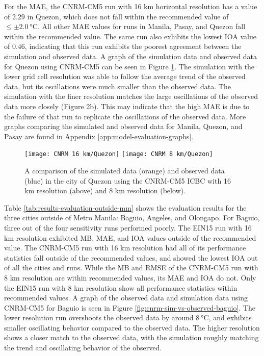 		For the MAE, the CNRM-CM5 run with 16 km horizontal resolution has a value of $2.29$ in Quezon, which does not fall within the recommended value of $\leq \pm \qty{2.0}{\degreeCelsius}$.
		All other MAE values for runs in Manila, Pasay, and Quezon fall within the recommended value.
		The same run also exhibits the lowest IOA value of $0.46$, indicating that this run exhibits the poorest agreement between the simulation and observed data.
		A graph of the simulation data and observed data for Quezon using CNRM-CM5 can be seen in Figure \ref{fig:cnrm-sim-vs-observed-quezon}. 
		The simulation with the lower grid cell resolution was able to follow the average trend of the observed data, but its oscillations were much smaller than the observed data.
		The simulation with the finer resolution matches the large oscillations of the observed data more closely (Figure 2b).
		This may indicate that the high MAE is due to the failure of that run to replicate the oscillations of the observed data.
		More graphs comparing the simulated and observed data for Manila, Quezon, and Pasay are found in Appendix \ref{app:model-evaluation-graphs}.

		
		\begin{figure}	
			\centering
			\texttt{[image: CNRM 16 km/Quezon]}
			\texttt{[image: CNRM 8 km/Quezon]}
			\caption{
				A comparison of the simulated data (orange) and observed data (blue) in the city of Quezon using the CNRM-CM5 ICBC with 16 km resolution (above) and 8 km resolution (below).
			}
			\label{fig:cnrm-sim-vs-observed-quezon}
		\end{figure}
		
		Table \ref{tab:results-evaluation-outside-mm} shows the evaluation results for the three cities outside of Metro Manila: Baguio, Angeles, and Olongapo.
		For Baguio, three out of the four sensitivity runs performed poorly.
		The EIN15 run with 16 km resolution exhibited MB, MAE, and IOA values outside of the recommended value.
		The CNRM-CM5 run with 16 km resolution had all of its performance statistics fall outside of the recommended values, and showed the lowest IOA out of all the cities and runs.
		While the MB and RMSE of the CNRM-CM5 run with 8 km resolution are within recommended values, its MAE and IOA do not.
		Only the EIN15 run with 8 km resolution show all performance statistics within recommended values.
		A graph of the observed data and simulation data using CNRM-CM5 for Baguio is seen in Figure \ref{fig:cnrm-sim-vs-observed-baguio}.
		The lower resolution run overshoots the observed data by around $\qty{8}{\degreeCelsius}$, and exhibits smaller oscillating behavior compared to the observed data.
		The higher resolution shows a closer match to the observed data, with the simulation roughly matching the trend and oscillating behavior of the observed.
			
